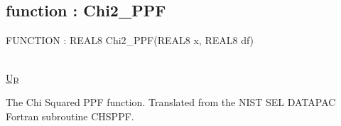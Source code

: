 \subsection*{function : Chi2\_PPF}
\hypertarget{ecldoc:logisticregression.distributions.chi2_ppf}{FUNCTION : REAL8 Chi2\_PPF(REAL8 x, REAL8 df)} \\
\hyperlink{ecldoc:LogisticRegression.Distributions}{Up} \\
\par
The Chi Squared PPF function. Translated from the NIST SEL DATAPAC Fortran subroutine CHSPPF. \\

